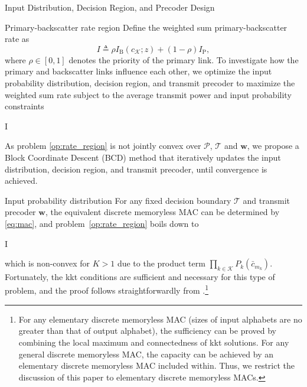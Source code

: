 \documentclass[journal]{IEEEtran}
\begin{document}
	\begin{section}{Input Distribution, Decision Region, and Precoder Design}
		\begin{subsection}{Primary-backscatter rate region}
			Define the weighted sum primary-backscatter rate as
			\begin{equation}
				I \triangleq \rho I_{\mathrm{B}}(c_{\mathcal{K}} ; z) + (1 - \rho) I_{\mathrm{P}},
			\end{equation}
			where $\rho \in [0,1]$ denotes the priority of the primary link. To investigate how the primary and backscatter links influence each other, we optimize the input probability distribution, decision region, and transmit precoder to maximize the weighted sum rate subject to the average transmit power and input probability constraints

			\begin{maxi!}
				{}{I}{\label{op:rate_region}}{\label{ob:weighted_sum_rate}}
			\end{maxi!}

			As problem \eqref{op:rate_region} is not jointly convex over $\mathcal{P}$, $\mathcal{T}$ and $\boldsymbol{w}$, we propose a Block Coordinate Descent (BCD) method that iteratively updates the input distribution, decision region, and transmit precoder, until convergence is achieved.
		\end{subsection}

		\begin{subsection}{Input probability distribution}
			For any fixed decision boundary $\mathcal{T}$ and transmit precoder $\boldsymbol{w}$, the equivalent discrete memoryless MAC can be determined by \eqref{eq:mac}, and problem~\eqref{op:rate_region} boils down to
			\begin{maxi!}
				{}{I}{\label{op:input_probability_distribution}}{}
				\addConstraint{\eqref{co:sum_probability},\eqref{co:nonnegative_probability},}
			\end{maxi!}
			which is non-convex for $K > 1$ due to the product term $\prod_{k \in \mathcal{K}} P_k(\bar{c}_{m_k})$. Fortunately, the \gls{kkt} conditions are sufficient and necessary for this type of problem, and the proof follows straightforwardly from \cite{Watanabe2009}.\footnote{For any elementary discrete memoryless MAC (sizes of input alphabets are no greater than that of output alphabet), the sufficiency can be proved by combining the local maximum and connectedness of \gls{kkt} solutions. For any general discrete memoryless MAC, the capacity can be achieved by an elementary discrete memoryless MAC included within. Thus, we restrict the discussion of this paper to elementary discrete memoryless MACs.}


\end{subsection}
\end{section}
\end{document}
